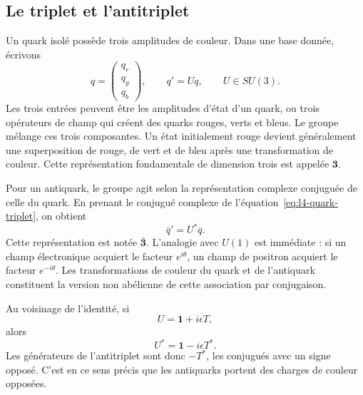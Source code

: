 \subsection{Le triplet et l’antitriplet}

Un quark isolé possède trois amplitudes de couleur. Dans une base donnée, écrivons
\begin{equation}
q=
\begin{pmatrix}
q_r\\q_g\\q_b
\end{pmatrix},
\qquad
q'=Uq,
\qquad U\in SU(3).
\label{eq:l4-quark-triplet}
\end{equation}
Les trois entrées peuvent être les amplitudes d’état d’un quark, ou trois opérateurs de champ qui créent des quarks rouges, verts et bleus. Le groupe mélange ces trois composantes. Un état initialement rouge devient généralement une superposition de rouge, de vert et de bleu après une transformation de couleur. Cette représentation fondamentale de dimension trois est appelée \(\boldsymbol 3\).

Pour un antiquark, le groupe agit selon la représentation complexe conjuguée de celle du quark. En prenant le conjugué complexe de l’équation~\eqref{eq:l4-quark-triplet}, on obtient
\begin{equation}
\bar q'=U^*\bar q.
\end{equation}
Cette représentation est notée \(\bar{\boldsymbol 3}\). L’analogie avec \(U(1)\) est immédiate : si un champ électronique acquiert le facteur \(e^{i\theta}\), un champ de positron acquiert le facteur \(e^{-i\theta}\). Les transformations de couleur du quark et de l’antiquark constituent la version non abélienne de cette association par conjugaison.

Au voisinage de l’identité, si
\begin{equation}
U=\boldsymbol 1+i\epsilon T,
\end{equation}
alors
\begin{equation}
U^*=\boldsymbol 1-i\epsilon T^*.
\end{equation}
Les générateurs de l’antitriplet sont donc \(-T^*\), les conjugués avec un signe opposé. C’est en ce sens précis que les antiquarks portent des charges de couleur opposées.

\begin{classroomqa}
\end{classroomqa}

